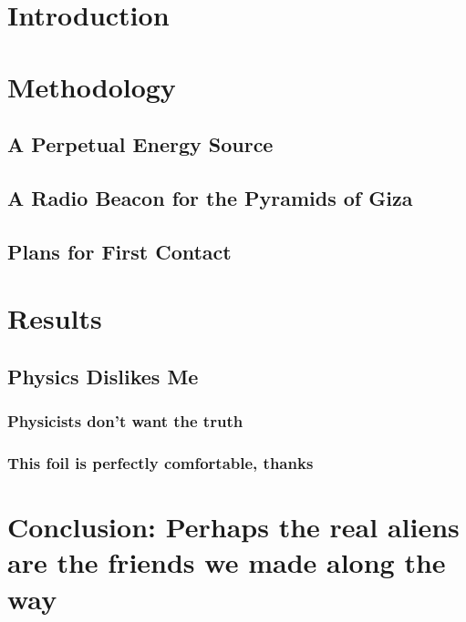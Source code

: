 \documentclass{article}
\begin{document}
\section{Introduction}

\section{Methodology}
\subsection{A Perpetual Energy Source}
\subsection{A Radio Beacon for the Pyramids of Giza}
\subsection{Plans for First Contact}

\section{Results}
\subsection{Physics Dislikes Me}
\subsubsection{Physicists don't want the truth}
\subsubsection{This foil is perfectly comfortable, thanks}

\section{Conclusion: Perhaps the real aliens are
 the friends we made along the way}
\end{document}
